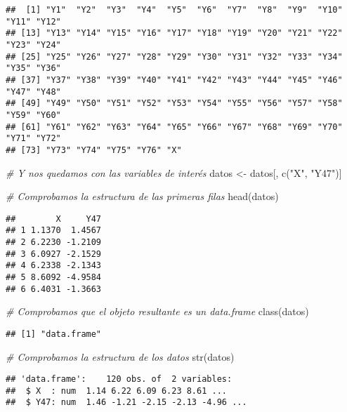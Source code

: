\documentclass[
]{article}
\newenvironment{Shaded}{\begin{snugshade}}{\end{snugshade}}
\newcommand{\CommentTok}[1]{\textcolor[rgb]{0.56,0.35,0.01}{\textit{#1}}}
\newcommand{\FunctionTok}[1]{\textcolor[rgb]{0.00,0.00,0.00}{#1}}
\newcommand{\NormalTok}[1]{#1}
\newcommand{\OtherTok}[1]{\textcolor[rgb]{0.56,0.35,0.01}{#1}}
\newcommand{\StringTok}[1]{\textcolor[rgb]{0.31,0.60,0.02}{#1}}
\begin{document}
\begin{verbatim}
##  [1] "Y1"  "Y2"  "Y3"  "Y4"  "Y5"  "Y6"  "Y7"  "Y8"  "Y9"  "Y10" "Y11" "Y12"
## [13] "Y13" "Y14" "Y15" "Y16" "Y17" "Y18" "Y19" "Y20" "Y21" "Y22" "Y23" "Y24"
## [25] "Y25" "Y26" "Y27" "Y28" "Y29" "Y30" "Y31" "Y32" "Y33" "Y34" "Y35" "Y36"
## [37] "Y37" "Y38" "Y39" "Y40" "Y41" "Y42" "Y43" "Y44" "Y45" "Y46" "Y47" "Y48"
## [49] "Y49" "Y50" "Y51" "Y52" "Y53" "Y54" "Y55" "Y56" "Y57" "Y58" "Y59" "Y60"
## [61] "Y61" "Y62" "Y63" "Y64" "Y65" "Y66" "Y67" "Y68" "Y69" "Y70" "Y71" "Y72"
## [73] "Y73" "Y74" "Y75" "Y76" "X"
\end{verbatim}

\begin{Shaded}
\begin{Highlighting}[]
\CommentTok{\# Y nos quedamos con las variables de interés}
\NormalTok{datos }\OtherTok{\textless{}{-}}\NormalTok{ datos[, }\FunctionTok{c}\NormalTok{(}\StringTok{"X"}\NormalTok{, }\StringTok{"Y47"}\NormalTok{)]}

\CommentTok{\# Comprobamos la estructura de las primeras filas}
\FunctionTok{head}\NormalTok{(datos)}
\end{Highlighting}
\end{Shaded}

\begin{verbatim}
##        X     Y47
## 1 1.1370  1.4567
## 2 6.2230 -1.2109
## 3 6.0927 -2.1529
## 4 6.2338 -2.1343
## 5 8.6092 -4.9584
## 6 6.4031 -1.3663
\end{verbatim}

\begin{Shaded}
\begin{Highlighting}[]
\CommentTok{\# Comprobamos que el objeto resultante es un data.frame}
\FunctionTok{class}\NormalTok{(datos)}
\end{Highlighting}
\end{Shaded}

\begin{verbatim}
## [1] "data.frame"
\end{verbatim}

\begin{Shaded}
\begin{Highlighting}[]
\CommentTok{\# Comprobamos la estructura de los datos}
\FunctionTok{str}\NormalTok{(datos)}
\end{Highlighting}
\end{Shaded}

\begin{verbatim}
## 'data.frame':    120 obs. of  2 variables:
##  $ X  : num  1.14 6.22 6.09 6.23 8.61 ...
##  $ Y47: num  1.46 -1.21 -2.15 -2.13 -4.96 ...
\end{verbatim}
\end{document}

